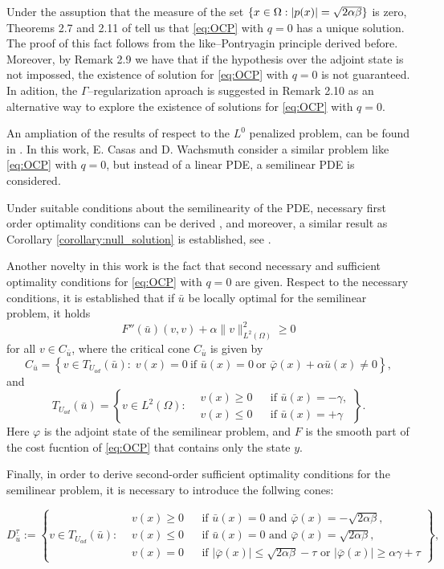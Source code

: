 Under the assuption that the measure of the set 
$\{x\in \Omega: |p(x)|=\sqrt{2\alpha\beta}\}$ is zero, Theorems 2.7 and 2.11 
of \cite{ito-kunisch2014} tell us that \eqref{eq:OCP} with $q=0$
has a unique solution. The proof of this fact follows from the 
like--Pontryagin principle derived before. Moreover, by Remark 2.9 we have that
if the hypothesis over the adjoint state is not impossed, the existence of
solution for \eqref{eq:OCP} with $q=0$ is not guaranteed. In adition, the $\Gamma$--regularization
aproach is suggested in Remark 2.10 as an alternative way to explore the
existence of solutions for \eqref{eq:OCP} with $q=0$.

An ampliation of the results of \cite{ito-kunisch2014} respect to the 
$L^0$ penalized problem, can be found in \cite{casasl0}. In this work,
E. Casas and D. Wachsmuth consider a similar problem like \eqref{eq:OCP} with
$q=0$, but instead of a linear PDE, a semilinear PDE is considered. 

Under suitable conditions about the semilinearity of the PDE, necessary first 
order optimality conditions can be derived \cite[Theorem 3.1]{casasl0}, and 
moreover, a similar result as Corollary \ref{corollary:null_solution}
is established, see \cite[Corollary 3.3]{casasl0}. 

Another novelty in this work is the fact that second necessary and 
sufficient optimality conditions for \eqref{eq:OCP} with $q=0$ are given. Respect 
to the necessary conditions, it is established that if $\bar u$ be locally optimal for the
semilinear problem, it holds
\[
F''(\bar u)(v,v) + \alpha \|v\|_{L^2(\Omega)}^2 \ge 0
\]
for all $v \in C_{\bar u}$, where the critical cone $C_{\bar u}$ is given by
\[
C_{\bar u}
=
\left\{
v \in T_{U_{ad}}(\bar u)
:
\; v(x)=0
\ \text{if } \bar u(x)=0
\ \text{or } \bar\varphi(x)+\alpha \bar u(x) \neq 0
\right\},
\]
and
\[
T_{U_{ad}}(\bar u)
=
\left\{
v \in L^2(\Omega) :
\begin{aligned}
&v(x) \ge 0 && \text{if } \bar u(x) = -\gamma,\\
&v(x) \le 0 && \text{if } \bar u(x) = +\gamma
\end{aligned}
\right\}.
\]
Here $\varphi$ is the adjoint state of the semilinear problem, and $F$ is the 
smooth part of the cost fucntion of \eqref{eq:OCP} that contains only the state $y$.

Finally, in order to derive second-order sufficient optimality conditions 
for the semilinear problem, it is necessary to introduce the follwing cones:

\[
D_{\bar u}^{\tau}
:=
\left\{
v \in T_{U_{ad}}(\bar u) :
\begin{aligned}
&v(x) \ge 0 && \text{if } \bar u(x)=0 \text{ and } \bar\varphi(x) = -\sqrt{2\alpha\beta},\\
&v(x) \le 0 && \text{if } \bar u(x)=0 \text{ and } \bar\varphi(x) = \sqrt{2\alpha\beta},\\
&v(x) = 0 && \text{if } |\bar\varphi(x)| \le \sqrt{2\alpha\beta}-\tau
\text{ or } |\bar\varphi(x)| \ge \alpha\gamma+\tau
\end{aligned}
\right\},
\]

